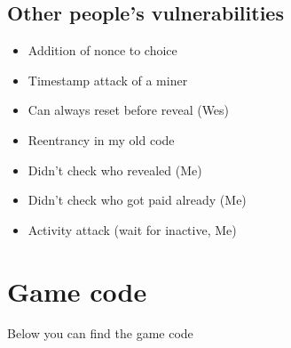 \documentclass{article}
\begin{document}
    \subsection{Other people's vulnerabilities}
    \begin{itemize}
        \item Addition of nonce to choice
        \item Timestamp attack of a miner
        \item Can always reset before reveal (Wes)
        \item Reentrancy in my old code
        \item Didn't check who revealed (Me)
        \item Didn't check who got paid already (Me)
        \item Activity attack (wait for inactive, Me)
    \end{itemize}

    \section{Game code}
    Below you can find the game code
    
\end{document}
